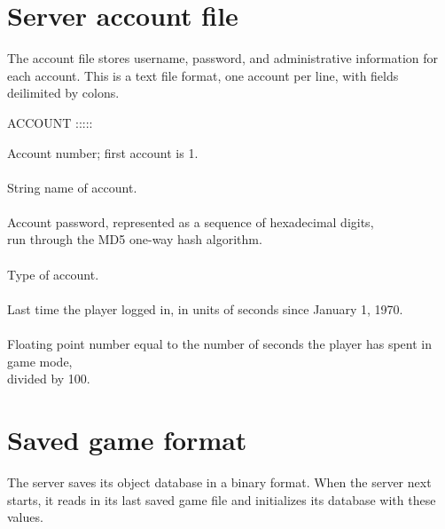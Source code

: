 \section{Server account file}

The account file stores username, password, and administrative
information for each account.  This is a text file format, one account
per line, with fields deilimited by colons.

ACCOUNT :::::

\begin{protocol}
Account number; first account is 1. \\
\\
String name of account. \\
\\
Account password, represented as a sequence of hexadecimal digits, \\
run through the MD5 one-way hash algorithm. \\
\\
Type of account. \\
\\
Last time the player logged in, in units of seconds since January 1,
1970. \\
\\
Floating point number equal to the number of seconds the player has
spent in game mode, \\
divided by 100. \\
\end{protocol}

\section{Saved game format}

The server saves its object database in a binary format.  When the
server next starts, it reads in its last saved game file and
initializes its database with these values.

